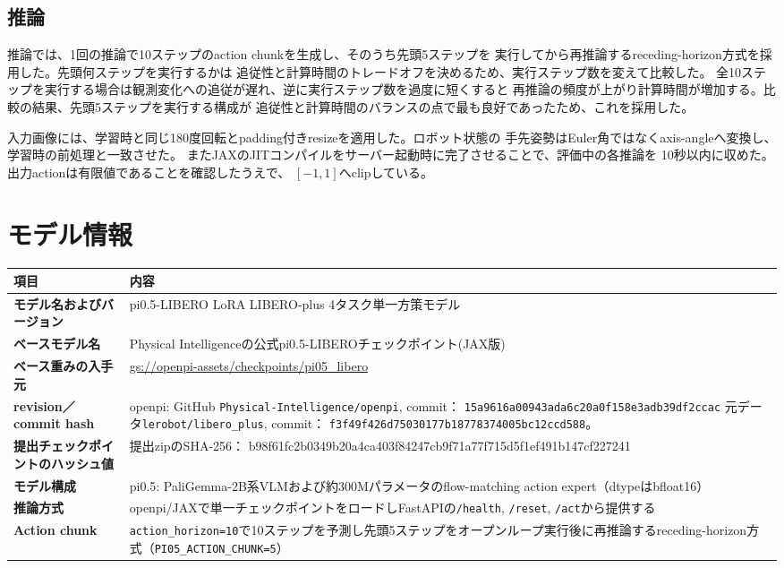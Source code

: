 \documentclass[10pt,a4paper]{article}
\newcommand{\code}[1]{\texttt{\small #1}}
\newcommand{\reportrow}[2]{\textbf{#1} & #2 \\}
\newcommand{\tablehead}{\rowcolor{blue!12}\textbf{項目} & \textbf{内容} \\}
\begin{document}
\subsection{推論}

推論では、1回の推論で10ステップのaction chunkを生成し、そのうち先頭5ステップを
実行してから再推論するreceding-horizon方式を採用した。先頭何ステップを実行するかは
追従性と計算時間のトレードオフを決めるため、実行ステップ数を変えて比較した。
全10ステップを実行する場合は観測変化への追従が遅れ、逆に実行ステップ数を過度に短くすると
再推論の頻度が上がり計算時間が増加する。比較の結果、先頭5ステップを実行する構成が
追従性と計算時間のバランスの点で最も良好であったため、これを採用した。

入力画像には、学習時と同じ180度回転とpadding付きresizeを適用した。ロボット状態の
手先姿勢はEuler角ではなくaxis-angleへ変換し、学習時の前処理と一致させた。
またJAXのJITコンパイルをサーバー起動時に完了させることで、評価中の各推論を
10秒以内に収めた。出力actionは有限値であることを確認したうえで、
$[-1,1]$へclipしている。

\small
\section{モデル情報}

\begin{tabularx}{\textwidth}{@{}LY@{}}
\toprule
\tablehead
\midrule
\reportrow{モデル名およびバージョン}{
  pi0.5-LIBERO LoRA LIBERO-plus 4タスク単一方策モデル}
\reportrow{ベースモデル名}{
  Physical Intelligenceの公式pi0.5-LIBEROチェックポイント(JAX版)}
\reportrow{ベース重みの入手元}{
  \url{gs://openpi-assets/checkpoints/pi05_libero}}
\reportrow{revision／commit hash}{
  openpi: GitHub \code{Physical-Intelligence/openpi}, commit：
  \code{15a9616a00943ada6c20a0f158e3adb39df2ccac}
  元データ\code{lerobot/libero\_plus}, commit：
  \code{f3f49f426d75030177b18778374005bc12ccd588}。}
\reportrow{提出チェックポイントのハッシュ値}{
  提出zipのSHA-256：
  {\scriptsize\ttfamily b98f61fc2b0349b20a4ca403f84247cb9f71a77f715d5f1ef491b147cf227241}}
\reportrow{モデル構成}{
  pi0.5: PaliGemma-2B系VLMおよび約300Mパラメータのflow-matching action expert（dtypeはbfloat16）}
\reportrow{推論方式}{
  openpi/JAXで単一チェックポイントをロードしFastAPIの\code{/health}, \code{/reset}, \code{/act}から提供する}
\reportrow{Action chunk}{
  \code{action\_horizon=10}で10ステップを予測し先頭5ステップをオープンループ実行後に再推論するreceding-horizon方式（\code{PI05\_ACTION\_CHUNK=5}）}
\bottomrule
\end{tabularx}
\end{document}
